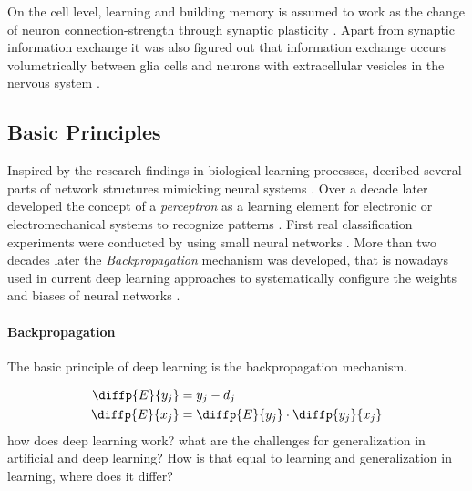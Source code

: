     On the cell level, learning and building memory is assumed to work as the change of neuron connection-strength through synaptic plasticity \citep{do1949organization,martin2000synaptic}. Apart from synaptic information exchange it was also figured out that information exchange occurs volumetrically between glia cells and neurons with extracellular vesicles in the nervous system \citep{schiera2019communcation}.


    \subsection{Basic Principles}

        Inspired by the research findings in biological learning processes, \citeauthor{mcculloch1943logical} decribed several parts of network structures mimicking neural systems \citep{mcculloch1943logical}.
        Over a decade later \citeauthor{rosenblatt1957perceptron} developed the concept of a \emph{perceptron} as a learning element for electronic or electromechanical systems to recognize patterns \citep{rosenblatt1957perceptron}.
        First real classification experiments were conducted by \citeauthor{widrow1960adaptive} using small neural networks \citep{widrow1960adaptive}.
        More than two decades later the \emph{Backpropagation} mechanism was developed, that is nowadays used in current deep learning approaches to systematically configure the weights and biases of neural networks \citep{rumelhart1986learning}.


        \paragraph{Backpropagation} The basic principle of deep learning is the backpropagation mechanism.

        \begin{align}
            \diffp{E}{{y_j}} &= y_j - d_j \\
            \diffp{E}{{x_j}} &= \diffp{E}{{y_j}} \cdot \diffp{{y_j}}{{x_j}}
        \end{align}
        how does deep learning work?
        what are the challenges for generalization in artificial and deep learning?
        How is that equal to learning and generalization in learning, where does it differ?



